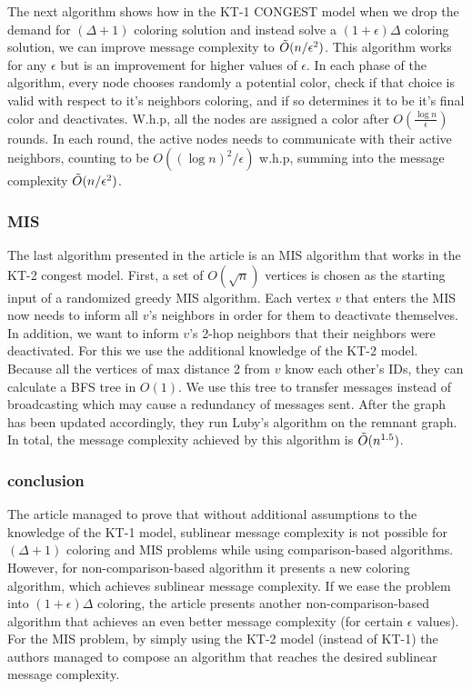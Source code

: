 \documentclass[11pt]{article}
\begin{document}
The next algorithm shows how in the KT-1 CONGEST model when we drop the demand for $(\Delta+1)$ coloring solution and instead solve a $(1+\epsilon)\Delta$ coloring solution, we can improve message complexity to $\Tilde{O}(n/\epsilon^2)$. This algorithm works for any $\epsilon$ but is an improvement for higher values of $\epsilon$.
In each phase of the algorithm, every node chooses randomly a potential color, check if that choice is valid with respect to it's neighbors coloring, and if so determines it to be it's final color and deactivates. W.h.p, all the nodes are assigned a color after $O(\frac{\log{n}}{\epsilon})$ rounds. In each round, the active nodes needs to communicate with their active neighbors, counting to be $O((\log{n})^{2}/ \epsilon)$ w.h.p, summing into the message complexity $\Tilde{O}(n/\epsilon^2)$.

\subsubsection*{MIS}

The last algorithm presented in the article is an MIS algorithm that works in the KT-2 congest model. First, a set of $O(\sqrt{n})$ vertices is chosen as the starting input of a randomized greedy MIS algorithm. Each vertex $v$ that enters the MIS now needs to inform all $v$'s neighbors in order for them to deactivate themselves. In addition, we want to inform $v$'s 2-hop neighbors that their neighbors were deactivated. For this we use the additional knowledge of the KT-2 model. Because all the vertices of max distance 2 from $v$ know each other's IDs, they can calculate a BFS tree in $O(1)$. We use this tree to transfer messages instead of broadcasting which may cause a redundancy of messages sent. After the graph has been updated accordingly, they run Luby's \cite{Luby} algorithm on the remnant graph. In total, the message complexity achieved by this algorithm is $\Tilde{O}(n^{1.5})$.

\subsubsection*{conclusion}
The article managed to prove that without additional assumptions to the knowledge of the KT-1 model, sublinear message complexity is not possible for $(\Delta + 1)$ coloring and MIS problems while using comparison-based algorithms. However, for non-comparison-based algorithm it presents a new coloring algorithm, which achieves sublinear message complexity. If we ease the problem into $(1+\epsilon)\Delta$ coloring, the article presents another non-comparison-based algorithm that achieves an even better message complexity (for certain $\epsilon$ values). For the MIS problem, by simply using the KT-2 model (instead of KT-1) the authors managed to compose an algorithm that reaches the desired sublinear message complexity.
\newline
\end{document}

